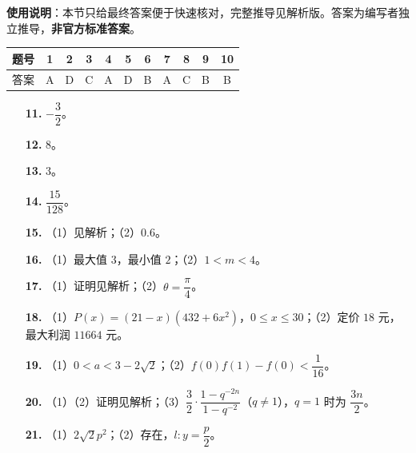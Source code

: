 
\begin{gknotice}
\textbf{使用说明}：本节只给最终答案便于快速核对，完整推导见解析版。答案为编写者独立推导，\textbf{非官方标准答案}。
\end{gknotice}

\begin{center}\begin{tabular}{ccccccccccc}
\toprule
题号 & 1 & 2 & 3 & 4 & 5 & 6 & 7 & 8 & 9 & 10 \\
\midrule
答案 & A & D & C & A & D & B & A & C & B & B \\
\bottomrule
\end{tabular}\end{center}

\begin{itemize}[leftmargin=2.6em]
  \item[\textbf{11.}] $-\dfrac32$。
  \item[\textbf{12.}] $8$。
  \item[\textbf{13.}] $3$。
  \item[\textbf{14.}] $\dfrac{15}{128}$。
  \item[\textbf{15.}] （1）见解析；（2）$0.6$。
\end{itemize}

\begin{itemize}[leftmargin=2.6em]
  \item[\textbf{16.}] （1）最大值 $3$，最小值 $2$；（2）$1<m<4$。
  \item[\textbf{17.}] （1）证明见解析；（2）$\theta=\dfrac{\pi}{4}$。
  \item[\textbf{18.}] （1）$P(x)=(21-x)(432+6x^2)$，$0\leqslant x\leqslant30$；（2）定价 $18$ 元，最大利润 $11664$ 元。
  \item[\textbf{19.}] （1）$0<a<3-2\sqrt2$；（2）$f(0)f(1)-f(0)<\dfrac1{16}$。
  \item[\textbf{20.}] （1）（2）证明见解析；（3）$\dfrac32\cdot\dfrac{1-q^{-2n}}{1-q^{-2}}$（$q\neq1$），$q=1$ 时为 $\dfrac{3n}2$。
  \item[\textbf{21.}] （1）$2\sqrt2p^2$；（2）存在，$l:y=\dfrac p2$。
\end{itemize}
